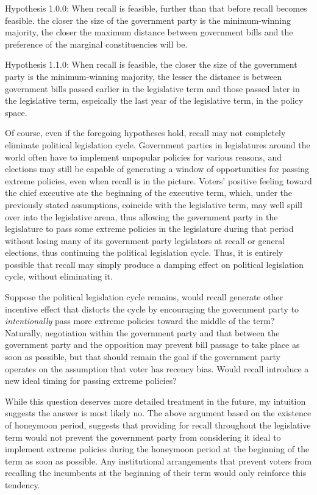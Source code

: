 \documentclass[hyphens, crop=false]{standalone}
\begin{document}
	Hypothesis 1.0.0: When recall is feasible,
	further than that before recall becomes feasible.
	the closer the size of the government party is the minimum-winning majority,
	the closer
	the maximum distance between government bills
	and the preference of the marginal constituencies will be.
	
	Hypothesis 1.1.0: When recall is feasible,
	the closer the size of the government party is the minimum-winning majority,
	the lesser the distance is between government bills passed earlier in the legislative term
	and those passed later in the legislative term,
	espeically the last year of the legislative term,
	in the policy space.
	
	Of course,
	even if
	the foregoing hypotheses hold,
	recall may not completely eliminate political legislation cycle.
	Government parties in legislatures around the world
	often have to implement unpopular policies for various reasons,
	and elections may still be capable of generating
	a window of opportunities for passing extreme policies,
	even when recall is in the picture.
	Voters' positive feeling toward the chief executive
	ate the beginning of the executive term,
	which, under the previously stated assumptions,
	coincide with the legislative term,
	may well spill over into the legislative arena,
	thus allowing the government party in the legislature
	to pass some extreme policies in the legislature during that period
	without losing many of its government party legislators
	at recall or general elections,
	thus continuing the political legislation cycle.
	Thus, it is entirely possible that
	recall
	may simply produce a damping effect on political legislation cycle,
	without eliminating it.
	
	Suppose the political legislation cycle remains,
	would recall generate other incentive effect
	that distorts the cycle by encouraging the government party
	to \textit{intentionally} pass more extreme policies
	toward the middle of the term?
	Naturally,
	negotiation within the government party and
	that between the government party and the opposition
	may prevent bill passage to take place as soon as possible,
	but that should remain the goal if the government party operates on
	the assumption that voter has recency bias.
	Would recall introduce a new ideal timing for passing extreme policies?
	
	While this question deserves
	more detailed treatment in the future,
	my intuition suggests
	the answer is most likely no.
	The above argument based on the existence of honeymoon period,
	suggests that providing for recall throughout the legislative term
	would not prevent the government party from
	considering it ideal to implement extreme policies
	during the honeymoon period at the beginning of the term
	as soon as possible.
	Any institutional arrangements
	that prevent voters from recalling the incumbents
	at the beginning of their term would only reinforce this tendency.
	
\end{document}
